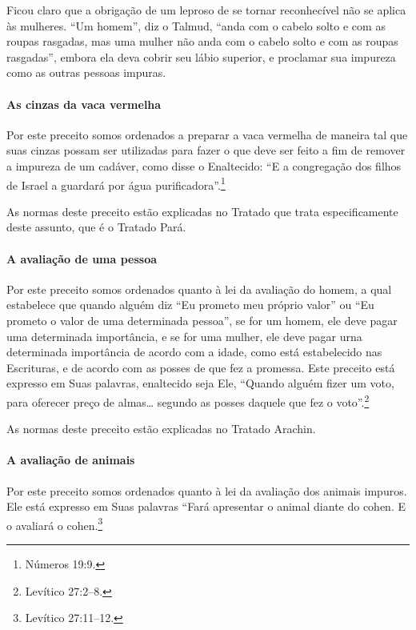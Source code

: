 \begin{multicols}{2}
Ficou claro que a obrigação de um leproso de se tornar reconhecível não
se aplica às mulheres. ``Um homem'', diz o Talmud\starr, ``anda com o cabelo
solto e com as roupas rasgadas, mas uma mulher não anda com o cabelo
solto e com as roupas rasgadas'', embora ela deva cobrir seu lábio
superior, e proclamar sua impureza como as outras pessoas impuras.

\paragraph{As cinzas da vaca vermelha}

Por este preceito somos ordenados a preparar a vaca vermelha de maneira
tal que suas cinzas possam ser utilizadas para fazer o que deve ser
feito a fim de remover a impureza de um cadáver, como disse o
Enaltecido: ``E a congregação dos filhos de Israel a guardará por água
purificadora''.\footnote{Números 19:9.}

As normas deste preceito estão explicadas no Tratado que trata
especificamente deste assunto, que é o Tratado Pará\starr.



\paragraph{A avaliação de uma pessoa}

Por este preceito somos ordenados quanto à lei da avaliação do homem, a
qual estabelece que quando alguém diz ``Eu prometo meu próprio valor''
ou ``Eu prometo o valor de uma determinada pessoa'', se for um homem,
ele deve pagar uma determinada importância, e se for uma mulher, ele
deve pagar urna determinada importância de acordo com a idade, como está
estabelecido nas Escrituras, e de acordo com as posses de que fez a
promessa. Este preceito está expresso em Suas palavras, enaltecido seja
Ele, ``Quando alguém fizer um voto, para oferecer preço de almas\ldots{}
segundo as posses daquele que fez o voto''.\footnote{Levítico 27:2--8.}

As normas deste preceito estão explicadas no Tratado Arachin\starr.


\paragraph{A avaliação de animais}

Por este preceito somos ordenados quanto à lei da avaliação dos animais
impuros. Ele está expresso em Suas palavras ``Fará apresentar o animal
diante do cohen\starr. E o avaliará o cohen\starr.\footnote{Levítico 27:11--12.}


\end{multicols}
